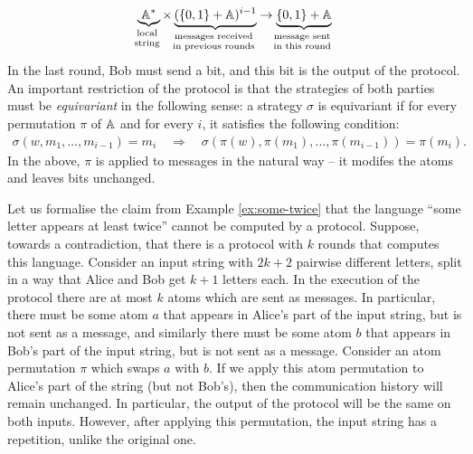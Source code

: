 \begin{align*}
\myunderbrace{\atoms^*}{local \\ string} \times \myunderbrace{(\set{0,1} + \atoms)^{i-1}}{messages received \\ in previous rounds} 
\to
\myunderbrace{\set{0,1} + \atoms}{message sent \\ in this round}
\end{align*}
In the last round, Bob must send a bit, and this bit is the output of the protocol.
An important restriction of the protocol is that the strategies of both parties must be \emph{equivariant} in the following sense: 
a strategy $\sigma$ is equivariant if for every permutation $\pi$ of $\mathbb A$ and for every $i$, it satisfies the following condition:
\begin{align*}
\sigma(w, m_1, \ldots, m_{i-1}) = m_i 
\quad \Rightarrow \quad
\sigma(\pi(w), \pi(m_1), \ldots, \pi(m_{i-1})) = \pi(m_i).
\end{align*}
In the above, $\pi$ is applied to messages in the natural way -- it modifes the atoms and leaves bits unchanged.

\begin{myexample}
    Let us formalise the claim from Example \ref{ex:some-twice} that the language ``some letter appears at least twice'' cannot be computed by a protocol. Suppose, towards a contradiction, that there is a protocol with $k$ rounds that computes this language. Consider an input string with $2k+2$ pairwise different letters, split in a way that Alice and Bob get $k+1$ letters each. In the execution of the protocol there are at most $k$ atoms which are sent as messages. In particular, there must be some atom $a$ that appears in Alice's part of the input string, but is not sent as a message, and similarly there must be some atom $b$ that appears in Bob's part of the input string, but is not sent as a message. Consider an atom permutation $\pi$ which swaps $a$ with $b$. If we apply this atom permutation to Alice's part of the string (but not Bob's), then the communication history will remain unchanged. In particular, the output of the protocol will be the same on both inputs. However, after applying this permutation, the input string has a repetition, unlike the original one. 
\end{myexample}


